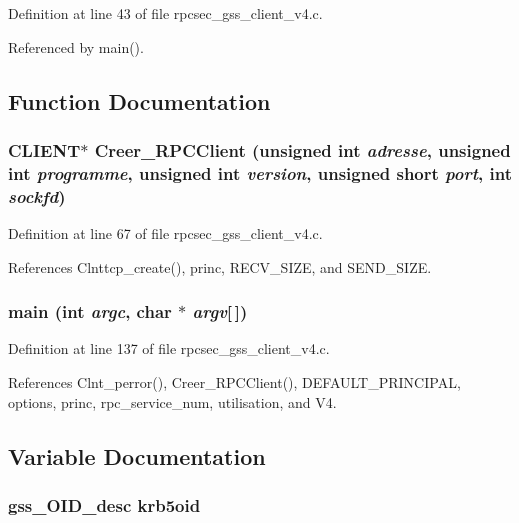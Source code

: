 Definition at line 43 of file rpcsec\_\-gss\_\-client\_\-v4.c.

Referenced by main().

\subsection{Function Documentation}
\subsubsection{\setlength{\rightskip}{0pt plus 5cm}CLIENT$\ast$ Creer\_\-RPCClient (unsigned int {\em adresse}, unsigned int {\em programme}, unsigned int {\em version}, unsigned short {\em port}, int {\em sockfd})}\label{rpcsec__gss__client__v4_8c_a15}




Definition at line 67 of file rpcsec\_\-gss\_\-client\_\-v4.c.

References Clnttcp\_\-create(), princ, RECV\_\-SIZE, and SEND\_\-SIZE.
\subsubsection{\setlength{\rightskip}{0pt plus 5cm}main (int {\em argc}, char $\ast$ {\em argv}[$\,$])}\label{rpcsec__gss__client__v4_8c_a16}




Definition at line 137 of file rpcsec\_\-gss\_\-client\_\-v4.c.

References Clnt\_\-perror(), Creer\_\-RPCClient(), DEFAULT\_\-PRINCIPAL, options, princ, rpc\_\-service\_\-num, utilisation, and V4.

\subsection{Variable Documentation}
\subsubsection{\setlength{\rightskip}{0pt plus 5cm}gss\_\-OID\_\-desc {\bf krb5oid}}\label{rpcsec__gss__client__v4_8c_a10}




